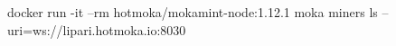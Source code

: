 \begin{shellcommandbox}\begin{ttlst}
docker run -it --rm hotmoka/mokamint-node:1.12.1 moka miners ls --uri=ws://lipari.hotmoka.io:8030
\end{ttlst}\end{shellcommandbox}
